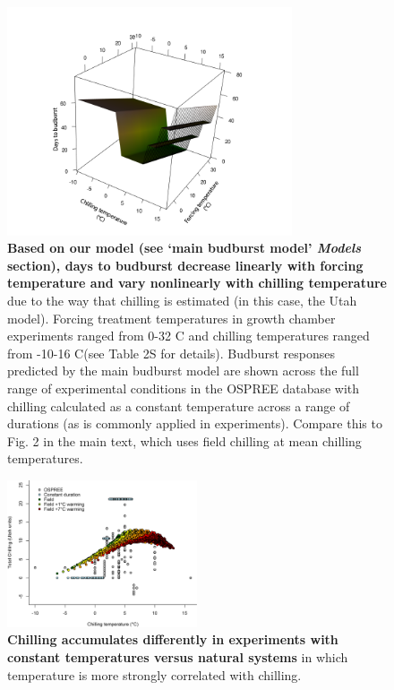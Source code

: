 \documentclass{article}
\begin{document}
\begin{figure}[h!]
\centering
\noindent \includegraphics[width=0.75\textwidth]{..//..//analyses/bb_analysis/figures/bbmod_3dplot_utah.png}
\caption{\textbf{Based on our model (see `main budburst model' \emph{Models} section), days to budburst decrease linearly with forcing temperature and vary nonlinearly with chilling temperature} due to the way that chilling is estimated (in this case, the Utah model). Forcing treatment temperatures in growth chamber experiments ranged from 0-32 \degree C and chilling temperatures ranged from -10-16 \degree C(see Table 2S for details). Budburst responses predicted by the main budburst model are shown across the full range of experimental conditions in the OSPREE database with chilling calculated as a constant temperature across a range of durations (as  is commonly applied in experiments). Compare this to Fig. 2 in the main text, which uses field chilling at mean chilling temperatures.}
\label{fig:3dexpchillutah}
\end{figure}

\begin{figure}[h!]
\centering
\noindent \includegraphics[width=0.50\textwidth]{..//..//analyses/bb_analysis/figures/exp_vs_field_chill_withwarmingcols.png}
\caption{\textbf{Chilling accumulates differently in experiments with constant temperatures versus natural systems} in which temperature is more strongly correlated with chilling.}
\label{fig:chillexpfield}
\end{figure}
\end{document}

